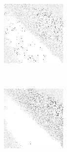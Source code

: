 \begin{figure}
\begin{subfigure}[t]{0.22\textwidth}
		\caption{\peggingmaxavggained}
	\end{subfigure}
	~
	\begin{subfigure}[t]{0.22\textwidth}
		\includegraphics[width=\textwidth]{images/findings/experiments/randomization/strats/pegging_max_med_gained.png}
		\caption{\peggingmaxmedgained}
	\end{subfigure}
	~
	\begin{subfigure}[t]{0.22\textwidth}
		\includegraphics[width=\textwidth]{images/findings/experiments/randomization/strats/pegging_min_avg_given.png}
		\caption{\peggingminavggiven}
	\end{subfigure}


\end{figure}

